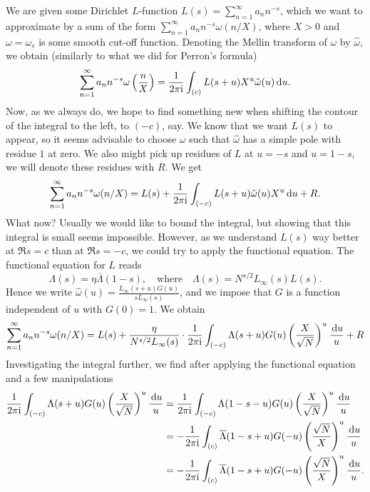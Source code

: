 \documentclass[a4paper,11pt]{article}
\begin{document}
We are given some Dirichlet $L$-function $L(s) = \sum_{n=1}^\infty a_n n^{-s}$,
which we want to approximate by a sum of the form 
$\sum_{n=1}^\infty a_n n^{-s} \omega(n/X)$, where $X>0$ and $\omega = \omega_s$
is some smooth cut-off function. Denoting the Mellin transform of $\omega$ by
$\hat \omega$, we obtain (similarly to what we did for Perron's formula)
\begin{equation}
    \sum_{n=1}^\infty a_n n^{-s} \omega\left(\frac nX \right) = \frac{1}{2 \pi \mathrm i} \int_{(c)} 
    L(s+u) X^u \hat \omega(u)  \mathrm{\,d} u.
\end{equation}
Now, as we always do, we hope to find something new when shifting the contour 
of the integral to the left, to $(-c)$, say. We know that we want $L(s)$ to appear,
so it seems advisable to choose $\omega$ such that $\hat \omega$ has a simple
pole with residue $1$ at zero. We also might pick up residues of $L$ at 
$u = -s$ and $u = 1-s$, we will denote these residues with $R$. We get
\[
    \sum_{n=1}^\infty a_n n^{-s} \omega(n/X) = 
    L(s) + \frac{1}{2 \pi \mathrm i} \int_{(-c)} L(s+u) \hat \omega(u) X^u \mathrm{\,d} u + R.
\]
What now? Usually we would like to bound the integral, but showing that this integral
is small seems impossible. However, as we understand $L(s)$ way better at 
$\Re s = c$ than at $\Re s = -c$, we could try to apply the functional equation.
The functional equation for $L$ reads
\[
    \Lambda(s) = \eta \bar \Lambda(1-s), \quad \text{where} \quad \Lambda(s) = 
    N^{s/2} L_\infty(s) L(s). 
\]
Hence we write $\hat \omega(u) = \frac{L_\infty(s+u) G(u)}{s L_\infty(s)}$, and we
impose that $G$ is a function independent of $u$ with $G(0) =1$. We obtain 
\begin{equation}
\sum_{n=1}^\infty a_n n^{-s} \omega(n/X)  = 
L(s) + \frac{\eta}{N^{s/2} L_\infty(s)} \cdot \frac1 {2\pi \mathrm i} 
\int_{(-c)} \Lambda(s+u) G(u) \left( \frac X{\sqrt N} \right)^u \frac {\mathrm{\,d} u} u + R
\end{equation} 
Investigating the integral further, we find after applying the functional equation 
and a few manipulations
\[
\begin{aligned}
    \frac{1}{2 \pi \mathrm i} \int_{(-c)} \Lambda(s+u) G(u) \left( \frac X{\sqrt N} \right)^u
    \frac {\mathrm{\,d} u} u 
    &=  \frac{1}{2 \pi \mathrm i} \int_{(-c)} \Lambda(1-s-u) G(u) \left( \frac X{\sqrt N} \right)^u \frac {\mathrm{\,d} u} u \\
    &=  -\frac{1}{2 \pi \mathrm i} \int_{(c)} \overline \Lambda(1-s+u) G(-u) \left( \frac {\sqrt N}X \right)^u \frac {\mathrm{\,d} u} u \\
    &=  -\frac{1}{2 \pi \mathrm i} \int_{(c)} \overline \Lambda(1-s+u) G(-u) \left( \frac {\sqrt N}X \right)^u \frac {\mathrm{\,d} u} u. 
\end{aligned}
\]
\end{document}
